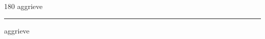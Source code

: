 
\begin{frame}
\begin{center}
\begin{turn}{180}
{\fontsize{2.5cm}{1em}\selectfont aggrieve}
\end{turn}
\vspace{1em}\par  
\hrule
\vspace{1em}\par  
{\fontsize{2.5cm}{1em}\selectfont aggrieve}
\end{center}
\end{frame}
